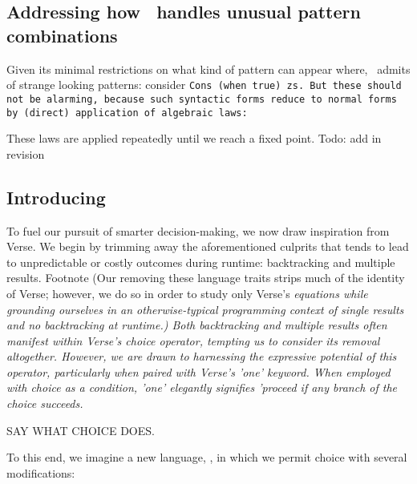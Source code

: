 \documentclass[manuscript,screen,review, 12pt]{acmart}
\begin{document}
    
\subsection{Addressing how \PPlus\ handles unusual pattern combinations}




    Given its minimal restrictions on what kind of pattern can appear where,
    \PPlus\ admits of strange looking patterns: consider \tt{Cons (when true)
    zs}. But these should not be alarming, because such syntactic forms reduce
    to normal forms by (direct) application of algebraic laws: 

    
        
        

        
        
        
        
        
        
        

        
        These laws are applied repeatedly until we reach a fixed point. 
        Todo: add in revision 
\subsection{Introducing \VMinus\ }

        
        To fuel our pursuit of smarter decision-making, we now draw inspiration
        from Verse. We begin by trimming away the aforementioned culprits that
        tends to lead to unpredictable or costly outcomes during runtime:
        backtracking and multiple results. Footnote (Our removing these language
        traits strips much of the identity of Verse; however, we do so in order
        to study only Verse's \it{equations} while grounding ourselves in an
        otherwise-typical programming context of single results and no
        backtracking at runtime.) Both backtracking and multiple results often
        manifest within Verse's choice operator, tempting us to consider its
        removal altogether. However, we are drawn to harnessing the expressive
        potential of this operator, particularly when paired with Verse's 'one'
        keyword. When employed with choice as a condition, 'one' elegantly
        signifies 'proceed if any branch of the choice succeeds. 
        
        
        SAY WHAT CHOICE DOES. 

        To this end, we imagine a new language, \VMinus, in which we permit
        choice with several modifications:
\end{document}
